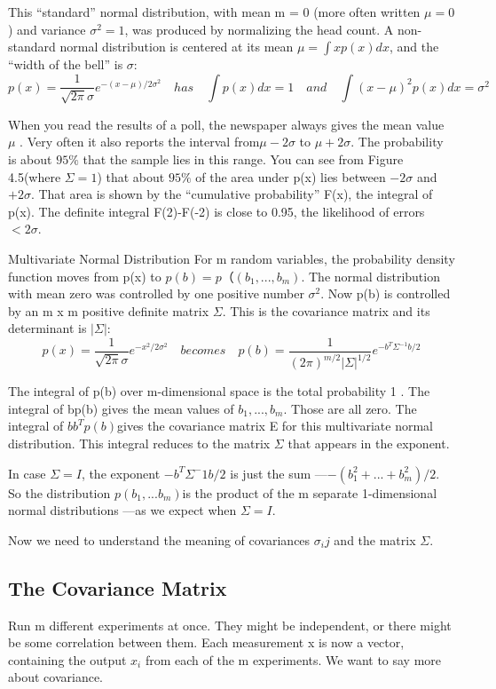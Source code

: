 	This “standard” normal distribution, with mean m = 0 (more often written $\mu=0$) and variance $\sigma^2=1$, was produced by normalizing the head count. A non-standard normal distribution is centered at its mean $\mu=\int xp(x)dx$, and the “width of the bell” is $\sigma$:
	\begin{equation}
	p(x)=\frac{1}{\sqrt{2\pi}\sigma}e^{-(x-\mu)/2\sigma^{2}}
	\quad has \quad
	\int p(x)dx=1 \quad and \quad \int(x-\mu)^2p(x)dx=\sigma^2
	\end{equation}
	 
	 When you read the results of a poll, the newspaper always gives the mean value $\mu$ .
	 Very often it also reports the interval from$\mu-2\sigma$ to $\mu+2\sigma$. The probability is
	 about $95\%$ that the sample lies in this range. You can see from Figure 4.5(where $\Sigma=1$) that about $95\%$ of the area under p(x) lies between $-2\sigma$ and $+2\sigma$. That area is shown by the “cumulative probability” F(x), the integral of p(x). The definite integral F(2)-F(-2) is close to 0.95, the likelihood of errors $<2\sigma$.
	 
	 Multivariate Normal Distribution\; For m random variables, the probability density function moves from p(x) to $p(b)=p（(b_1,...,b_m)$. The normal distribution with mean zero was controlled by one positive number $\sigma^2$. Now p(b) is controlled by an m x m positive definite matrix $\Sigma$. This is the covariance matrix and its determinant is $|\Sigma|$:
	 \begin{equation*}
	 p(x)=\frac{1}{\sqrt{2\pi}\sigma}e^{-x^2/2\sigma^2}
	 \quad becomes \quad
	 p(b)=\frac{1}{(2\pi)^{m/2}|\Sigma|^{1/2}}e^{-b^{T}\Sigma^{-1}b/2}
	 \end{equation*}
	
	The integral of p(b) over m-dimensional space is the total probability 1 . The integral
	of bp(b) gives the mean values of $b_1,...,b_m$. Those are all zero. The integral of
	$bb^Tp(b)$gives the covariance matrix E for this multivariate normal distribution. This
	integral reduces to the matrix $\Sigma$ that appears in the exponent.
	
	In case $\Sigma=I$, the exponent $-b^T\Sigma^-1b/2$ is just the sum —$-(b^2_1+...+b^2_m)/2$. So
	the distribution $p(b_1,...b_m)$is the product of the m separate 1-dimensional normal distributions —as we expect when $\Sigma=I$.
	
	Now we need to understand the meaning of covariances $\sigma_ij$ and the matrix $\Sigma$.
	
	\subsection{The Covariance Matrix}
	Run m different experiments at once. They might be independent, or there might be some
	correlation between them. Each measurement x is now a vector, containing the output $x_i$
	from each of the m experiments. We want to say more about covariance.
	
